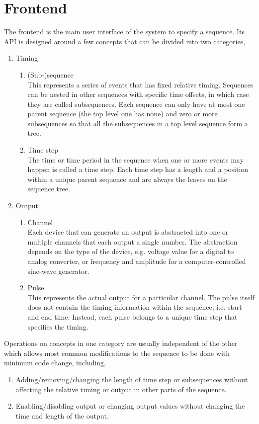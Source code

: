 \section{Frontend}
\label{ch:computer-control:frontend}

The frontend is the main user interface of the system to specify a sequence.
Its API is designed around a few concepts that can be divided into two categories,
\begin{enumerate}
\item Timing
  \begin{enumerate}
  \item (Sub-)sequence\\
    This represents a series of events that has fixed relative timing.
    Sequences can be nested in other sequences with specific time offsets,
    in which case they are called subsequences.
    Each sequence can only have at most one parent sequence (the top level one has none)
    and zero or more subsequences
    so that all the subsequences in a top level sequence form a tree.
  \item Time step\\
    The time or time period in the sequence when one or more events may happen
    is called a time step.
    Each time step has a length and a position within a unique parent sequence
    and are always the leaves on the sequence tree.
  \end{enumerate}
\item Output
  \begin{enumerate}
  \item Channel\\
    Each device that can generate an output is abstracted into
    one or multiple channels that each output a single number.
    The abstraction depends on the type of the device,
    e.g. voltage value for a digital to analog converter,
    or frequency and amplitude for a computer-controlled sine-wave generator.
  \item Pulse\\
    This represents the actual output for a particular channel.
    The pulse itself does not contain the timing information within the sequence,
    i.e. start and end time.
    Instead, each pulse belongs to a unique time step that specifies the timing.
  \end{enumerate}
\end{enumerate}
Operations on concepts in one category are usually independent of the other
which allows most common modifications to the sequence to be done
with minimum code change, including,
\begin{enumerate}
\item Adding/removing/changing the length of time step or subsequences
  without affecting the relative timing or output in other parts of the sequence.
\item Enabling/disabling output or changing output values
  without changing the time and length of the output.
\end{enumerate}

